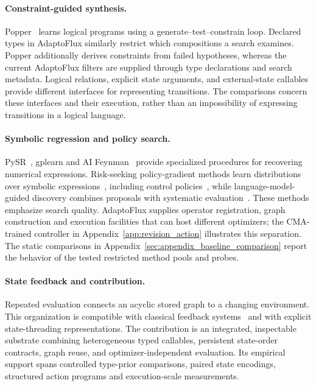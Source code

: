 \paragraph{Constraint-guided synthesis.}
Popper~\cite{cropper2021learning} learns logical programs using a generate--test--constrain loop. Declared types in AdaptoFlux similarly restrict which compositions a search examines. Popper additionally derives constraints from failed hypotheses, whereas the current AdaptoFlux filters are supplied through type declarations and search metadata. Logical relations, explicit state arguments, and external-state callables provide different interfaces for representing transitions. The comparisons concern these interfaces and their execution, rather than an impossibility of expressing transitions in a logical language.

\paragraph{Symbolic regression and policy search.}
PySR~\cite{cranmer2023interpretable}, gplearn and AI Feynman~\cite{udrescu2020ai} provide specialized procedures for recovering numerical expressions. Risk-seeking policy-gradient methods learn distributions over symbolic expressions~\cite{petersen2019deep}, including control policies~\cite{landajuela2021discovering}, while language-model-guided discovery combines proposals with systematic evaluation~\cite{romera2024mathematical}. These methods emphasize search quality. AdaptoFlux supplies operator registration, graph construction and execution facilities that can host different optimizers; the CMA-trained controller in Appendix~\ref{app:revision_action} illustrates this separation. The static comparisons in Appendix~\ref{sec:appendix_baseline_comparison} report the behavior of the tested restricted method pools and probes.

\paragraph{State feedback and contribution.}
Repeated evaluation connects an acyclic stored graph to a changing environment. This organization is compatible with classical feedback systems~\cite{wiener1948cybernetics,ashby1960brain} and with explicit state-threading representations. The contribution is an integrated, inspectable substrate combining heterogeneous typed callables, persistent state-order contracts, graph reuse, and optimizer-independent evaluation. Its empirical support spans controlled type-prior comparisons, paired state encodings, structured action programs and execution-scale measurements.

